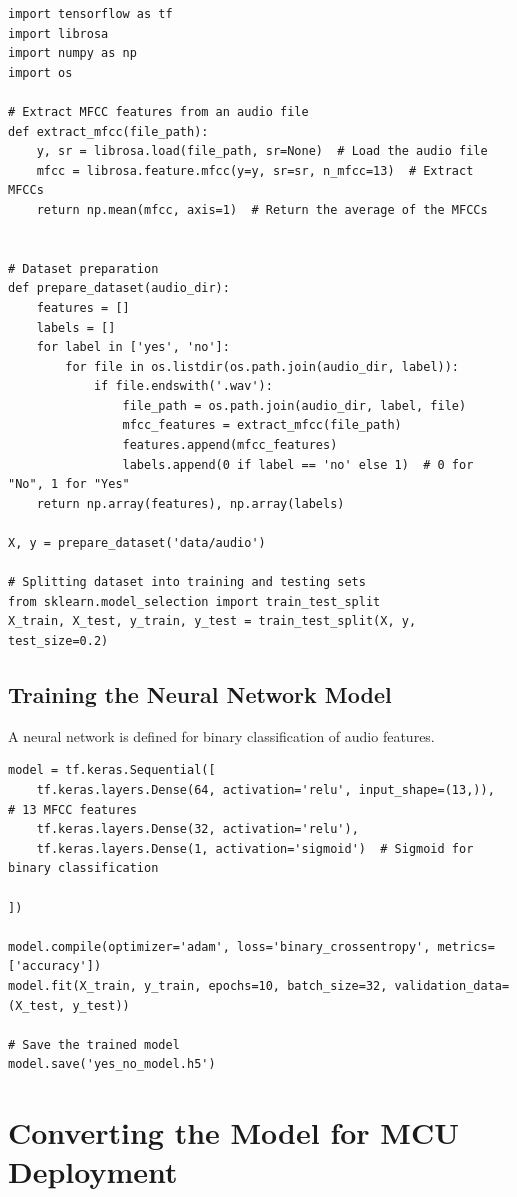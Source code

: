 \documentclass[
  9pt,
  letterpaper,
  abstract,
  titlepage]{scrbook}
\begin{document}
\begin{verbatim}
import tensorflow as tf
import librosa
import numpy as np
import os

# Extract MFCC features from an audio file
def extract_mfcc(file_path):
    y, sr = librosa.load(file_path, sr=None)  # Load the audio file
    mfcc = librosa.feature.mfcc(y=y, sr=sr, n_mfcc=13)  # Extract MFCCs
    return np.mean(mfcc, axis=1)  # Return the average of the MFCCs


# Dataset preparation
def prepare_dataset(audio_dir):
    features = []
    labels = []
    for label in ['yes', 'no']:
        for file in os.listdir(os.path.join(audio_dir, label)):
            if file.endswith('.wav'):
                file_path = os.path.join(audio_dir, label, file)
                mfcc_features = extract_mfcc(file_path)
                features.append(mfcc_features)
                labels.append(0 if label == 'no' else 1)  # 0 for "No", 1 for "Yes"
    return np.array(features), np.array(labels)

X, y = prepare_dataset('data/audio')

# Splitting dataset into training and testing sets
from sklearn.model_selection import train_test_split
X_train, X_test, y_train, y_test = train_test_split(X, y, test_size=0.2)
\end{verbatim}

\subsection{Training the Neural Network
Model}\label{training-the-neural-network-model}

A neural network is defined for binary classification of audio features.

\begin{verbatim}
model = tf.keras.Sequential([
    tf.keras.layers.Dense(64, activation='relu', input_shape=(13,)),  # 13 MFCC features
    tf.keras.layers.Dense(32, activation='relu'),
    tf.keras.layers.Dense(1, activation='sigmoid')  # Sigmoid for binary classification

])

model.compile(optimizer='adam', loss='binary_crossentropy', metrics=['accuracy'])
model.fit(X_train, y_train, epochs=10, batch_size=32, validation_data=(X_test, y_test))

# Save the trained model
model.save('yes_no_model.h5')
\end{verbatim}

\section{Converting the Model for MCU
Deployment}\label{converting-the-model-for-mcu-deployment}
\end{document}
